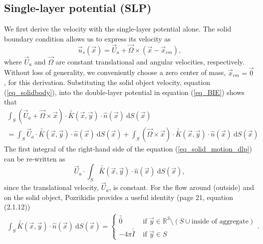 \subsection{Single-layer potential (SLP)}
We first derive the velocity with the single-layer potential alone.
The solid boundary condition allows us to express its velocity as 
\begin{equation}
	\vec{u}_s \left( \vec{x} \right) 
	= \vec{U}_a + \vec{\Omega} \times \left( \vec{x} - \vec{x}_{cm} \right),
	\label{eq_solidbody}
\end{equation}
where $\vec{U}_a$ and $\vec{\Omega}$ are constant translational and angular velocities, respectively. Without loss of generality, we conveniently choose a zero center of mass, $\vec{x}_{cm} = \vec{0}$, for this derivation.
Substituting the solid object velocity, equation (\ref{eq_solidbody}), into the double-layer potential in equation (\ref{eq_BIE}) shows that 
\begin{align}
	\int_S
	\left( \vec{U}_a + \vec{\Omega} \times \vec{x} \right)
	 \cdot  \bar{\bar{K}}(\vec{x},\vec{y})  
	\cdot \hat{n} ( \vec{x})
	\ \text{d}S(\vec{x})
    \nonumber \\
	= 
	\int_S
	\vec{U}_a
	 \cdot  \bar{\bar{K}}(\vec{x},\vec{y})  
	\cdot \hat{n} ( \vec{x})
	\ \text{d}S(\vec{x})
     + 	
	\int_S
	\left(  \vec{\Omega} \times \vec{x} \right)
	 \cdot  \bar{\bar{K}}(\vec{x},\vec{y})  
	\cdot \hat{n} ( \vec{x})
	\ \text{d}S(\vec{x})
	\label{eq_solid_motion_dlp}
\end{align}
The first integral of the right-hand side of the equation (\ref{eq_solid_motion_dlp}) can be re-written as 
\begin{equation}
	\vec{U}_a \cdot
	\int_S
	  \bar{\bar{K}}(\vec{x},\vec{y})  
	\cdot \hat{n} ( \vec{x})
	\ \text{d}S(\vec{x}),
	\label{eq_solid_motion_dlp_Ua}
\end{equation}
since the translational velocity, $\vec{U}_a$, is constant. 
For the flow around (outside) and on the solid object, Pozrikidis provides a useful identity \cite{pozrikidis_boundary_1992} (page 21, equation (2.1.12))
\begin{align}
	\int_S  \bar{\bar{K}}(\vec{x},\vec{y}) \cdot \hat{n} ( \vec{x})
	\ \text{d}S(\vec{x})
	=
	 \begin{cases}
	 \bar{\bar{0}} & \text{ if } \vec{y} \in \mathbb{R}^3  \setminus  \left( S \cup {\text{inside of aggregate}}\right) 	\\ 
	 - 4\pi \bar{\bar{I}} & \text{ if } \vec{y} \in S 
	 \end{cases}.
	\label{eq_dlp_identity1}
\end{align}

